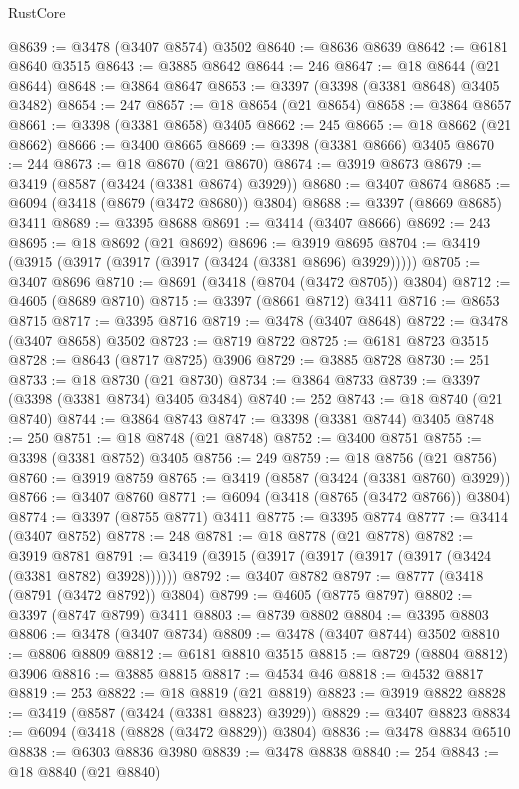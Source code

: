 \begin{lexlean}{RustCore}
\begin{coremodule}
@8639 := @3478 (@3407 @8574) @3502
@8640 := @8636 @8639
@8642 := @6181 @8640 @3515
@8643 := @3885 @8642
@8644 := 246
@8647 := @18 @8644 (@21 @8644)
@8648 := @3864 @8647
@8653 := @3397 (@3398 (@3381 @8648) @3405 @3482)
@8654 := 247
@8657 := @18 @8654 (@21 @8654)
@8658 := @3864 @8657
@8661 := @3398 (@3381 @8658) @3405
@8662 := 245
@8665 := @18 @8662 (@21 @8662)
@8666 := @3400 @8665
@8669 := @3398 (@3381 @8666) @3405
@8670 := 244
@8673 := @18 @8670 (@21 @8670)
@8674 := @3919 @8673
@8679 := @3419 (@8587 (@3424 (@3381 @8674) @3929))
@8680 := @3407 @8674
@8685 := @6094 (@3418 (@8679 (@3472 @8680)) @3804)
@8688 := @3397 (@8669 @8685) @3411
@8689 := @3395 @8688
@8691 := @3414 (@3407 @8666)
@8692 := 243
@8695 := @18 @8692 (@21 @8692)
@8696 := @3919 @8695
@8704 := @3419 (@3915 (@3917 (@3917 (@3917 (@3424 (@3381 @8696) @3929)))))
@8705 := @3407 @8696
@8710 := @8691 (@3418 (@8704 (@3472 @8705)) @3804)
@8712 := @4605 (@8689 @8710)
@8715 := @3397 (@8661 @8712) @3411
@8716 := @8653 @8715
@8717 := @3395 @8716
@8719 := @3478 (@3407 @8648)
@8722 := @3478 (@3407 @8658) @3502
@8723 := @8719 @8722
@8725 := @6181 @8723 @3515
@8728 := @8643 (@8717 @8725) @3906
@8729 := @3885 @8728
@8730 := 251
@8733 := @18 @8730 (@21 @8730)
@8734 := @3864 @8733
@8739 := @3397 (@3398 (@3381 @8734) @3405 @3484)
@8740 := 252
@8743 := @18 @8740 (@21 @8740)
@8744 := @3864 @8743
@8747 := @3398 (@3381 @8744) @3405
@8748 := 250
@8751 := @18 @8748 (@21 @8748)
@8752 := @3400 @8751
@8755 := @3398 (@3381 @8752) @3405
@8756 := 249
@8759 := @18 @8756 (@21 @8756)
@8760 := @3919 @8759
@8765 := @3419 (@8587 (@3424 (@3381 @8760) @3929))
@8766 := @3407 @8760
@8771 := @6094 (@3418 (@8765 (@3472 @8766)) @3804)
@8774 := @3397 (@8755 @8771) @3411
@8775 := @3395 @8774
@8777 := @3414 (@3407 @8752)
@8778 := 248
@8781 := @18 @8778 (@21 @8778)
@8782 := @3919 @8781
@8791 := @3419 (@3915 (@3917 (@3917 (@3917 (@3917 (@3424 (@3381 @8782) @3928))))))
@8792 := @3407 @8782
@8797 := @8777 (@3418 (@8791 (@3472 @8792)) @3804)
@8799 := @4605 (@8775 @8797)
@8802 := @3397 (@8747 @8799) @3411
@8803 := @8739 @8802
@8804 := @3395 @8803
@8806 := @3478 (@3407 @8734)
@8809 := @3478 (@3407 @8744) @3502
@8810 := @8806 @8809
@8812 := @6181 @8810 @3515
@8815 := @8729 (@8804 @8812) @3906
@8816 := @3885 @8815
@8817 := @4534 @46
@8818 := @4532 @8817
@8819 := 253
@8822 := @18 @8819 (@21 @8819)
@8823 := @3919 @8822
@8828 := @3419 (@8587 (@3424 (@3381 @8823) @3929))
@8829 := @3407 @8823
@8834 := @6094 (@3418 (@8828 (@3472 @8829)) @3804)
@8836 := @3478 @8834 @6510
@8838 := @6303 @8836 @3980
@8839 := @3478 @8838
@8840 := 254
@8843 := @18 @8840 (@21 @8840)

\end{coremodule}
\end{lexlean}
